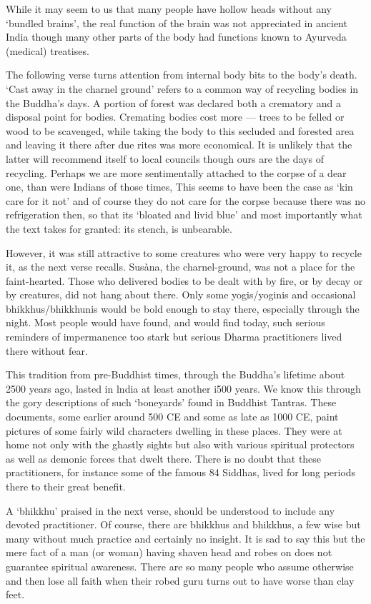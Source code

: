 While it may seem to us that many people have hollow heads without any `bundled brains', the real function of the brain was not appreciated in ancient India though many other parts of the body had functions known to Ayurveda (medical) treatises. 

The following verse turns attention from internal body bits to the body's death. `Cast away in the charnel ground' refers to a common way of recycling bodies in the Buddha's days. A portion of forest was declared both a crematory and a disposal point for bodies. Cremating bodies cost more — trees to be felled or wood to be scavenged, while taking the body to this secluded and forested area and leaving it there after due rites was more economical. It is unlikely that   the latter will recommend itself to local councils though ours are the days of recycling. Perhaps we are more sentimentally attached to the corpse of a dear   one, than were Indians of those times, This seems to have been the case as `kin care for it not' and of course they do not care for the corpse because there was no refrigeration then, so that its `bloated and livid blue' and most importantly what the text takes for granted: its stench, is unbearable.

However, it was still attractive to some creatures who were very happy to recycle it, as the next verse recalls. Sus\`ana, the charnel-ground, was not a place for the faint-hearted. Those who delivered bodies to be dealt with by ﬁre, or by decay or by creatures, did not hang about there. Only some yogis/yoginis and  occasional bhikkhus/bhikkhunis would be bold enough to stay there, especially through the night. Most people would have found, and would ﬁnd today, such serious reminders of impermanence too stark but serious Dharma practitioners lived there without fear.

This tradition from pre-Buddhist times, through the Buddha's lifetime about 2500 years ago, lasted in lndia at least another i500 years. We know this  through the gory descriptions of such `boneyards' found in Buddhist Tantras. These documents, some earlier around 500 CE and some as late as 1000 CE,  paint pictures of some fairly wild characters dwelling in these places. They were at home not only with the ghastly sights but also with various spiritual protectors as well as demonic forces that dwelt there. There is no doubt that these practitioners, for instance some of the famous 84 Siddhas, lived for long periods there to their great beneﬁt.

A `bhikkhu' praised in the next verse, should be understood to include any devoted practitioner. Of course, there are bhikkhus and bhikkhus, a few wise but many without much practice and certainly no insight. It is sad to say this but the mere fact of a man (or woman) having shaven head and robes on does not guarantee spiritual awareness. There are so many people who assume otherwise and then lose all faith when their robed guru turns out to have worse than clay feet. 

